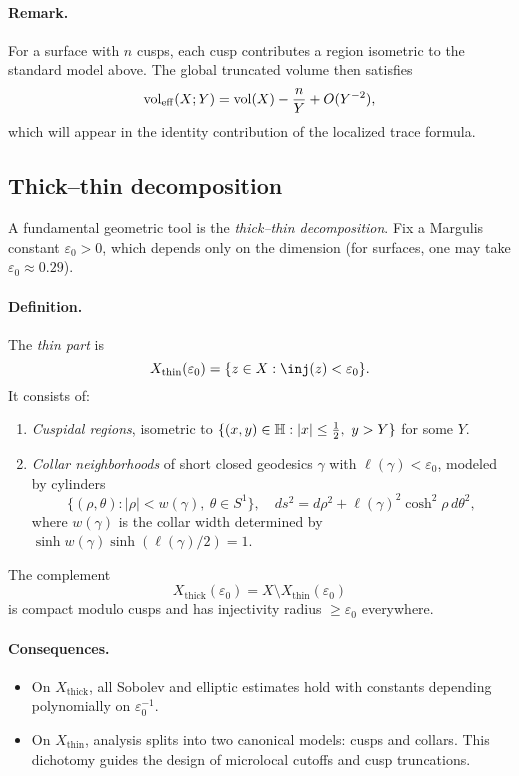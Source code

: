 \paragraph{Remark.}
For a surface with $n$ cusps, each cusp contributes a region isometric to the standard model above. The global truncated volume then satisfies
\[
\operatorname{vol}_{\mathrm{eff}}(X;Y) = \operatorname{vol}(X) - \frac{n}{Y} + O(Y^{-2}),
\]
which will appear in the identity contribution of the localized trace formula.

\subsection{Thick--thin decomposition}\label{subsec:thickthin}

A fundamental geometric tool is the \emph{thick--thin decomposition}.  
Fix a Margulis constant $\varepsilon_0 > 0$, which depends only on the dimension (for surfaces, one may take $\varepsilon_0 \approx 0.29$).  

\paragraph{Definition.}
The \emph{thin part} is
\[
X_{\mathrm{thin}}(\varepsilon_0) = \{ z\in X : \inj(z) < \varepsilon_0 \}.
\]
It consists of:
\begin{enumerate}
  \item \emph{Cuspidal regions}, isometric to
        $\{ (x,y)\in \mathbb{H} : |x|\le \tfrac12,\ y > Y \}$ for some $Y$.
  \item \emph{Collar neighborhoods} of short closed geodesics $\gamma$ with 
        $\ell(\gamma)<\varepsilon_0$, modeled by cylinders
        \[
        \{ (\rho,\theta) : |\rho|<w(\gamma), \ \theta\in S^1\}, \quad
        ds^2 = d\rho^2 + \ell(\gamma)^2 \cosh^2\rho\, d\theta^2,
        \]
        where $w(\gamma)$ is the collar width determined by $\sinh w(\gamma)\sinh(\ell(\gamma)/2)=1$.
\end{enumerate}

The complement
\[
X_{\mathrm{thick}}(\varepsilon_0) = X \setminus X_{\mathrm{thin}}(\varepsilon_0)
\]
is compact modulo cusps and has injectivity radius $\ge \varepsilon_0$ everywhere.

\paragraph{Consequences.}
\begin{itemize}
  \item On $X_{\mathrm{thick}}$, all Sobolev and elliptic estimates hold with constants depending polynomially on $\varepsilon_0^{-1}$.
  \item On $X_{\mathrm{thin}}$, analysis splits into two canonical models: cusps and collars. This dichotomy guides the design of microlocal cutoffs and cusp truncations.
\end{itemize}

